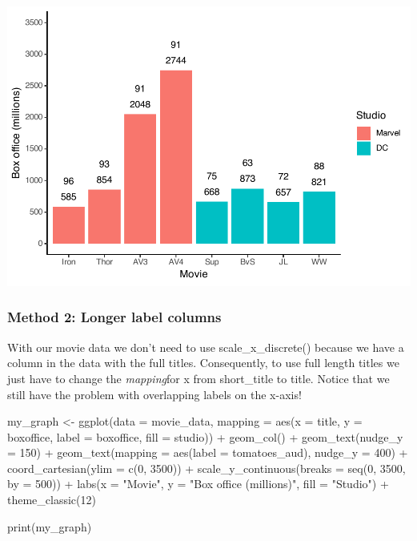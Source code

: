 \documentclass[
]{krantz}
\makeatletter
\newenvironment{Shaded}{\begin{snugshade}}{\end{snugshade}}
\newcommand{\AttributeTok}[1]{\textcolor[rgb]{0.61,0.61,0.61}{#1}}
\newcommand{\DecValTok}[1]{\textcolor[rgb]{0.06,0.06,0.06}{#1}}
\newcommand{\FunctionTok}[1]{\textcolor[rgb]{0,0,0}{#1}}
\newcommand{\NormalTok}[1]{#1}
\newcommand{\OtherTok}[1]{\textcolor[rgb]{0.37,0.37,0.37}{#1}}
\newcommand{\SpecialCharTok}[1]{\textcolor[rgb]{0,0,0}{#1}}
\newcommand{\StringTok}[1]{\textcolor[rgb]{0.5,0.5,0.5}{#1}}
\newenvironment{kframe}{%
\medskip{}
\setlength{\fboxsep}{.8em}
 \def\at@end@of@kframe{}%
 \ifinner\ifhmode%
  \def\at@end@of@kframe{\end{minipage}}%
  \begin{minipage}{\columnwidth}%
 \fi\fi%
 \def\FrameCommand##1{\hskip\@totalleftmargin \hskip-\fboxsep
 \colorbox{shadecolor}{##1}\hskip-\fboxsep
     \hskip-\linewidth \hskip-\@totalleftmargin \hskip\columnwidth}%
 \MakeFramed {\advance\hsize-\width
   \@totalleftmargin\z@ \linewidth\hsize
   \@setminipage}}%
 {\par\unskip\endMakeFramed%
 \at@end@of@kframe}
\renewenvironment{Shaded}{\begin{kframe}}{\end{kframe}}
\makeatother
\begin{document}
\includegraphics[width=0.65\linewidth]{bookdown_files/figure-latex/unnamed-chunk-123-1}

\hypertarget{method-2-longer-label-columns}{%
\subsubsection{Method 2: Longer label columns}\label{method-2-longer-label-columns}}

With our movie data we don't need to use scale\_x\_discrete() because we have a column in the data with the full titles. Consequently, to use full length titles we just have to change the \emph{mapping}for x from short\_title to title. Notice that we still have the problem with overlapping labels on the x-axis!

\begin{Shaded}
\begin{Highlighting}[]
\NormalTok{my\_graph }\OtherTok{\textless{}{-}} \FunctionTok{ggplot}\NormalTok{(}\AttributeTok{data =}\NormalTok{ movie\_data,}
           \AttributeTok{mapping =} \FunctionTok{aes}\NormalTok{(}\AttributeTok{x =}\NormalTok{ title,}
                         \AttributeTok{y =}\NormalTok{ boxoffice,}
                         \AttributeTok{label =}\NormalTok{ boxoffice, }
                         \AttributeTok{fill =}\NormalTok{ studio)) }\SpecialCharTok{+}
  \FunctionTok{geom\_col}\NormalTok{() }\SpecialCharTok{+}
  \FunctionTok{geom\_text}\NormalTok{(}\AttributeTok{nudge\_y =} \DecValTok{150}\NormalTok{)  }\SpecialCharTok{+}
  \FunctionTok{geom\_text}\NormalTok{(}\AttributeTok{mapping =} \FunctionTok{aes}\NormalTok{(}\AttributeTok{label =}\NormalTok{ tomatoes\_aud), }
            \AttributeTok{nudge\_y =} \DecValTok{400}\NormalTok{) }\SpecialCharTok{+}
  \FunctionTok{coord\_cartesian}\NormalTok{(}\AttributeTok{ylim =} \FunctionTok{c}\NormalTok{(}\DecValTok{0}\NormalTok{, }\DecValTok{3500}\NormalTok{)) }\SpecialCharTok{+}
  \FunctionTok{scale\_y\_continuous}\NormalTok{(}\AttributeTok{breaks =} \FunctionTok{seq}\NormalTok{(}\DecValTok{0}\NormalTok{, }\DecValTok{3500}\NormalTok{, }\AttributeTok{by =} \DecValTok{500}\NormalTok{)) }\SpecialCharTok{+}
  \FunctionTok{labs}\NormalTok{(}\AttributeTok{x =} \StringTok{"Movie"}\NormalTok{,}
       \AttributeTok{y =} \StringTok{"Box office (millions)"}\NormalTok{,}
       \AttributeTok{fill =} \StringTok{"Studio"}\NormalTok{) }\SpecialCharTok{+}
  \FunctionTok{theme\_classic}\NormalTok{(}\DecValTok{12}\NormalTok{)}
  

\FunctionTok{print}\NormalTok{(my\_graph)}
\end{Highlighting}
\end{Shaded}
\end{document}
